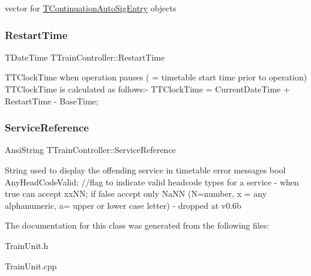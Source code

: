 vector for \mbox{\hyperlink{class_t_train_controller_1_1_t_continuation_auto_sig_entry}{T\+Continuation\+Auto\+Sig\+Entry}} objects \mbox{\label{class_t_train_controller_a7d7dc55374ee043f1045b1d4ff91853f}} 
\subsubsection{\texorpdfstring{Restart\+Time}{RestartTime}}
{\footnotesize\ttfamily T\+Date\+Time T\+Train\+Controller\+::\+Restart\+Time}

T\+T\+Clock\+Time when operation pauses ( = timetable start time prior to operation) T\+T\+Clock\+Time is calculated as follows\+:-\/ T\+T\+Clock\+Time = Current\+Date\+Time + Restart\+Time -\/ Base\+Time; \mbox{\label{class_t_train_controller_a1b103ff111456f178286d97002b63afb}} 
\subsubsection{\texorpdfstring{Service\+Reference}{ServiceReference}}
{\footnotesize\ttfamily Ansi\+String T\+Train\+Controller\+::\+Service\+Reference}

String used to display the offending service in timetable error messages bool Any\+Head\+Code\+Valid; //flag to indicate valid headcode types for a service -\/ when true can accept xx\+NN; if false accept only Na\+NN (N=number, x = any alphanumeric, a= upper or lower case letter) -\/ dropped at v0.\+6b 

The documentation for this class was generated from the following files\+:\begin{DoxyCompactItemize}
\item 
Train\+Unit.\+h\item 
Train\+Unit.\+cpp\end{DoxyCompactItemize}
